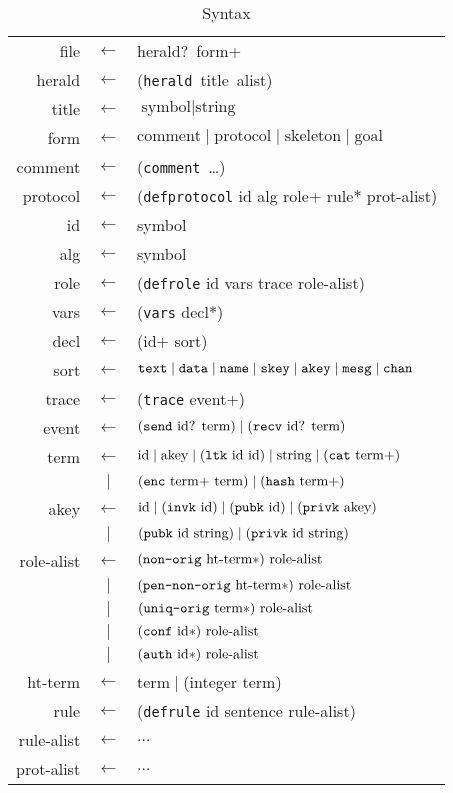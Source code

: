 \begin{table}
\newcommand{\sym}[1]{\textup{\texttt{#1}}}
\begin{center}\scshape
\begin{tabular}{rcl}
file&$\leftarrow$&herald?~form+
\\herald&$\leftarrow$&
(\sym{herald}~title~alist)
\\title&$\leftarrow$&$\mbox{symbol}\mid\mbox{string}$
\\form&$\leftarrow$&
$\mbox{comment}\mid\mbox{protocol}\mid\mbox{skeleton}\mid\mbox{goal}$
\\ comment&$\leftarrow$&
(\sym{comment}~\ldots)
\\ protocol&$\leftarrow$&
(\sym{defprotocol} id alg role+ rule$\ast$ prot-alist)
\\ id&$\leftarrow$&symbol
\\ alg&$\leftarrow$&symbol
\\ role&$\leftarrow$&
(\sym{defrole} id vars trace role-alist)
\\ vars&$\leftarrow$&
(\sym{vars} decl$\ast$)
\\ decl&$\leftarrow$&
(id+ sort)
\\ sort&$\leftarrow$&
$\sym{text} \mid \sym{data} \mid \sym{name} \mid \sym{skey}
\mid \sym{akey}\mid\sym{mesg}\mid\sym{chan}$
\\ trace&$\leftarrow$&(\sym{trace} event+)
\\ event&$\leftarrow$&
$(\sym{send}\mbox{ id? term})\mid(\sym{recv}\mbox{ id? term})$
\\ term&$\leftarrow$&
$\mbox{id}\mid\mbox{akey}\mid(\sym{ltk}\mbox{ id id})\mid\mbox{string}\mid(\sym{cat}\mbox{ term+})$
\\ &$\mid$&$(\sym{enc}\mbox{ term+ term})\mid(\sym{hash}\mbox{ term+})$
\\ akey&$\leftarrow$&
$\mbox{id}\mid(\sym{invk}\mbox{ id})
\mid(\sym{pubk}\mbox{ id})
\mid(\sym{privk}\mbox{ akey})$
\\ &$\mid$&$(\sym{pubk}\mbox{ id}\mbox{ string})
\mid(\sym{privk}\mbox{ id}\mbox{ string})$
\\ role-alist&$\leftarrow$&$
(\sym{non-orig}\mbox{ ht-term}\ast)\mbox{ role-alist}$
\\ &$\mid$&$(\sym{pen-non-orig}\mbox{ ht-term}\ast)\mbox{ role-alist}$
\\ &$\mid$&$(\sym{uniq-orig}\mbox{ term}\ast)\mbox{ role-alist}$
\\ &$\mid$&$(\sym{conf}\mbox{ id}\ast)\mbox{ role-alist}$
\\ &$\mid$&$(\sym{auth}\mbox{ id}\ast)\mbox{ role-alist}$
\\ ht-term&$\leftarrow$&term${}\mid{}$(integer term)
\\ rule&$\leftarrow$&
(\sym{defrule} id sentence rule-alist)
\\ rule-alist&$\leftarrow$&$\ldots$
\\ prot-alist&$\leftarrow$&$\ldots$
\end{tabular}
\end{center}
\caption{{\cpsa} Syntax}\label{tab:syntax}
\end{table}

